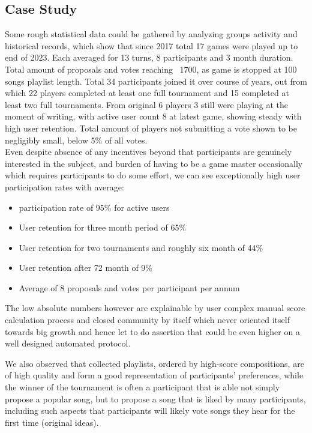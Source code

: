 \documentclass{article}
\begin{document}
\begin{CJK}{UTF8}{gbsn}
\begin{multicols}{2}
\section{Case Study}
Some rough statistical data could be gathered by analyzing groups activity and historical records, which show that since 2017 total 17 games were played up to end of 2023. Each averaged for 13 turns, 8 participants and 3 month duration. Total amount of proposals and votes reaching ~1700, as game is stopped at 100 songs playlist length. Total 34 participants joined it over course of years, out from which 22 players completed at least one full tournament and 15 completed at least two full tournaments. From original 6 players 3 still were playing at the moment of writing, with active user count 8 at latest game, showing steady with high user retention. Total amount of players not submitting a vote shown to be negligibly small, below 5\% of all votes. \\
Even despite absence of any incentives beyond that participants are genuinely interested in the subject, and burden of having to be a game master occasionally which requires participants to do some effort, we can see exceptionally high user participation rates with average:
\begin{itemize}
    \item participation rate of 95\% for active users
    \item User retention for three month period of 65\%
    \item User retention for two tournaments and roughly six month of 44\%
    \item User retention after 72 month of 9\%
    \item Average of 8 proposals and votes per participant per annum
\end{itemize}

The low absolute numbers however are explainable by user complex manual score calculation process and closed community by itself which never oriented itself towards big growth and hence let to do assertion that could be even higher on a well designed automated protocol.

We also observed that collected playlists, ordered by high-score compositions, are of high quality and form a good representation of participants' preferences, while the winner of the tournament is often a participant that is able not simply propose a popular song, but to propose a song that is liked by many participants, including such aspects that participants will likely vote songs they hear for the first time (original ideas).


\end{multicols}
\end{CJK}
\end{document}

